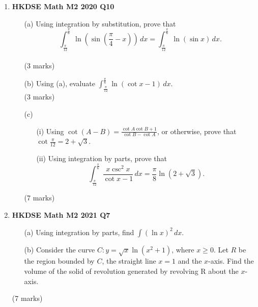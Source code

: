 \documentclass{report}
\begin{document}
\begin{enumerate}
	\item \textbf{HKDSE Math M2 2020 Q10}
	\begin{enumerate}
		\item [(a)]Using integration by substitution, prove that $$\displaystyle \int_{\tfrac{\pi}{12}}^{\tfrac{\pi}{6}}  \ln{\left(\sin{\left(\frac{\pi}{4} - x\right)}\right)}\,dx = \int_{\tfrac{\pi}{12}}^{\tfrac{\pi}{6}}  \ln{(\sin{x})}\,dx.$$ \\(3 marks)
		\item [(b)] Using (a), evaluate $\displaystyle \int_{\tfrac{\pi}{12}}^{\tfrac{\pi}{6}}  \ln{(\cot{x} - 1)}\,dx$. \\(3 marks)
		\item [(c)] 
		\begin{enumerate}
			\item [(i)] Using $\cot{(A-B)} = \displaystyle \frac{\cot{A}\cot{B}+1}{\cot{B} - \cot{A}}$, or otherwise, prove that $\displaystyle \cot{\frac{\pi}{12}} = 2 + \sqrt{3}$. 
			\item [(ii)] Using integration by parts, prove that $$\displaystyle\int_{\tfrac{\pi}{12}}^{\tfrac{\pi}{6}}  \frac{x\csc^2{x}}{\cot{x} -1}\,dx = \frac{\pi}{8} \ln{(2 + \sqrt{3})}.$$
		\end{enumerate}
	    (7 marks)
	\end{enumerate}

	\item \textbf{HKDSE Math M2 2021 Q7}
	\begin{enumerate}
		\item [(a)]Using integration by parts, find $\displaystyle\int (\ln{x})^2 \,dx$.
		\item [(b)] Consider the curve $\displaystyle C : y = \sqrt{x}\ln{(x^2+1)}$, where $x\geq 0$. Let $R$ be the region bounded by $C$, the straight line $x=1 $ and the $x$-axis. Find the volume of the solid of revolution generated by revolving R about the $x$-axis.
	\end{enumerate}
	(7 marks)

	\newpage


\end{enumerate}
\end{document}
